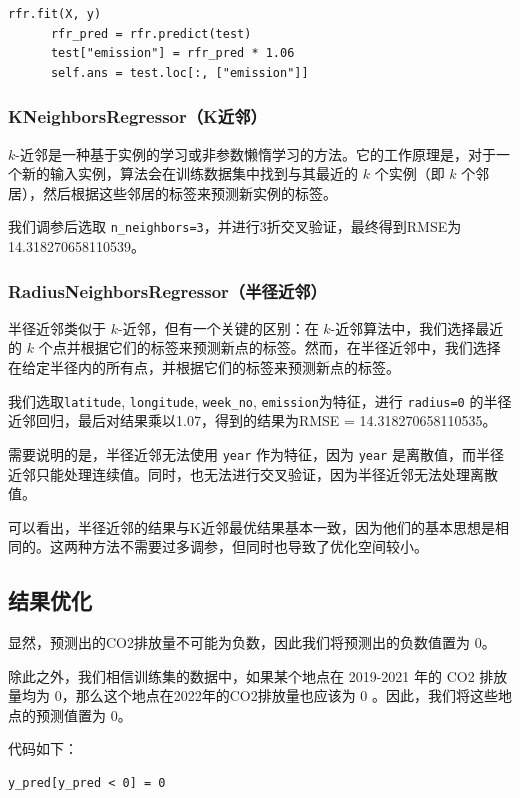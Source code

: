\documentclass{ctexart}
\begin{document}
\begin{sloppypar}
\begin{lstlisting}[style=Python]
      rfr.fit(X, y)
      rfr_pred = rfr.predict(test)
      test["emission"] = rfr_pred * 1.06
      self.ans = test.loc[:, ["emission"]]
\end{lstlisting}

\subsubsection{KNeighborsRegressor（K近邻）}

$k$-近邻是一种基于实例的学习或非参数懒惰学习的方法。它的工作原理是，对于一个新的输入实例，算法会在训练数据集中找到与其最近的 $k$ 个实例（即 $k$ 个邻居），然后根据这些邻居的标签来预测新实例的标签。

我们调参后选取 \texttt{n\_neighbors=3}，并进行3折交叉验证，最终得到RMSE为14.318270658110539。

\subsubsection{RadiusNeighborsRegressor（半径近邻）}

半径近邻类似于 $k$-近邻，但有一个关键的区别：在 $k$-近邻算法中，我们选择最近的 $k$ 个点并根据它们的标签来预测新点的标签。然而，在半径近邻中，我们选择在给定半径内的所有点，并根据它们的标签来预测新点的标签。

我们选取\texttt{latitude}, \texttt{longitude}, \texttt{week\_no}, \texttt{emission}为特征，进行 \texttt{radius=0} 的半径近邻回归，最后对结果乘以1.07，得到的结果为RMSE = 14.318270658110535。

需要说明的是，半径近邻无法使用 \texttt{year} 作为特征，因为 \texttt{year} 是离散值，而半径近邻只能处理连续值。同时，也无法进行交叉验证，因为半径近邻无法处理离散值。

可以看出，半径近邻的结果与K近邻最优结果基本一致，因为他们的基本思想是相同的。这两种方法不需要过多调参，但同时也导致了优化空间较小。

\subsection{结果优化}

显然，预测出的CO2排放量不可能为负数，因此我们将预测出的负数值置为 0。

除此之外，我们相信训练集的数据中，如果某个地点在 2019-2021 年的 CO2 排放量均为 0，那么这个地点在2022年的CO2排放量也应该为 0 。因此，我们将这些地点的预测值置为 0。

代码如下：

\begin{lstlisting}[style=Python]
      y_pred[y_pred < 0] = 0
      

\end{lstlisting}
\end{sloppypar}
\end{document}
